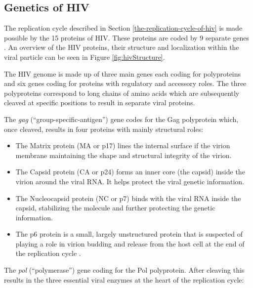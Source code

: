 \documentclass[
  11pt,
  twoside]{scrbook}
\begin{document}
\hypertarget{genetics-of-hiv}{%
\subsection{Genetics of HIV}\label{genetics-of-hiv}}

The replication cycle described in Section \ref{the-replication-cycle-of-hiv} is made possible by the 15 proteins of HIV. These proteins are coded by 9 separate genes \autocite{frankelHIV1FifteenProteins1998}. An overview of the HIV proteins, their structure and localization within the viral particle can be seen in Figure \ref{fig:hivStructure}.

The HIV genome is made up of three main genes each coding for polyproteins and six genes coding for proteins with regulatory and accessory roles. The three polyproteins correspond to long chains of amino acids which are subsequently cleaved at specific positions to result in separate viral proteins.

The \emph{gag} (``group-specific-antigen'') gene codes for the Gag polyprotein which, once cleaved, results in four proteins with mainly structural roles:

\begin{itemize}
\item
  The Matrix protein (MA or p17) lines the internal surface if the virion membrane maintaining the shape and structural integrity of the virion.
\item
  The Capsid protein (CA or p24) forms an inner core (the capsid) inside the virion around the viral RNA. It helps protect the viral genetic information.
\item
  The Nucleocapsid protein (NC or p7) binds with the viral RNA inside the capsid, stabilizing the molecule and further protecting the genetic information.
\item
  The p6 protein is a small, largely unstructured protein \autocite{fossenSolutionStructureHuman2005} that is suspected of playing a role in virion budding and release from the host cell at the end of the replication cycle \autocite{gottlingerEffectMutationsAffecting1991,huangP6GagRequiredParticle1995}.
\end{itemize}

The \emph{pol} (``polymerase'') gene coding for the Pol polyprotein. After cleaving this results in the three essential viral enzymes at the heart of the replication cycle:
\end{document}
